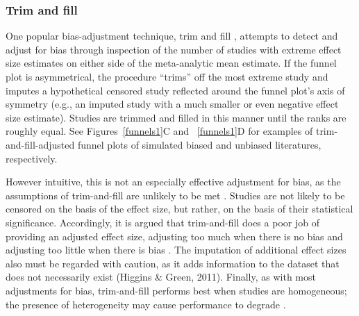 \documentclass[man, mask]{apa6}
\begin{document}
\subsubsection{Trim and fill}
One popular bias-adjustment technique, trim and fill \citep{Duval:Tweedie:2000}, attempts to detect and adjust for bias through inspection of the number of studies with extreme effect size estimates on either side of the meta-analytic mean estimate. If the funnel plot is asymmetrical, the procedure ``trims'' off the most extreme study and imputes a hypothetical censored study reflected around the funnel plot's axis of symmetry (e.g., an imputed study with a much smaller or even negative effect size estimate). Studies are trimmed and filled in this manner until the ranks are roughly equal. See Figures~\ref{funnels1}C and ~\ref{funnels1}D for examples of trim-and-fill-adjusted funnel plots of simulated biased and unbiased literatures, respectively. 

However intuitive, this is not an especially effective adjustment for bias, as the assumptions of trim-and-fill are unlikely to be met \citep{Simonsohn:etal:2014b}. Studies are not likely to be censored on the basis of the effect size, but rather, on the basis of their statistical significance. Accordingly, it is argued that trim-and-fill does a poor job of providing an adjusted effect size, adjusting too much when there is no bias and adjusting too little when there is bias \citep{Simonsohn:etal:2014b}. %
The imputation of additional effect sizes also must be regarded with caution, as it adds information to the dataset that does not necessarily exist (Higgins \& Green, 2011). Finally, as with most adjustments for bias, trim-and-fill performs best when studies are homogeneous; the presence of heterogeneity may cause performance to degrade \citep{Terrin:etal:2003}. %
\nocite{Higgins:Green:2011}
\end{document}

